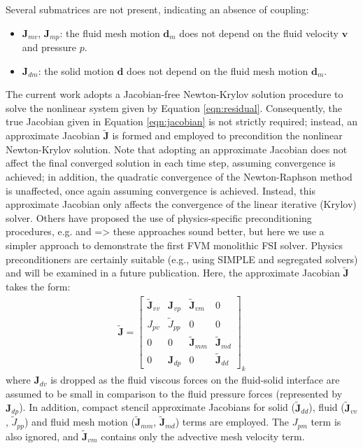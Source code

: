 \documentclass[sn-mathphys,Numbered]{sn-jnl}%
\newcommand{\bb}{\boldsymbol}
\begin{document}
Several submatrices are not present, indicating an absence of coupling:
\begin{itemize}
	\item $\bb{J}_{mv}$, $\bb{J}_{mp}$: the fluid mesh motion $\bb{d}_m$ does not depend on the fluid velocity $\bb{v}$ and pressure $p$.
	\item $\bb{J}_{dm}$: the solid motion $\bb{d}$ does not depend on the fluid mesh motion $\bb{d}_m$. 
\end{itemize}

The current work adopts a Jacobian-free Newton-Krylov solution procedure \citep{Cardiff2025JFNK} to solve the nonlinear system given by Equation \ref{eqn:residual}.
Consequently, the true Jacobian given in Equation \ref{eqn:jacobian} is not strictly required; instead, an approximate Jacobian $\tilde{\bb{J}}$ is formed and employed to precondition the nonlinear Newton-Krylov solution.
Note that adopting an approximate Jacobian does not affect the final converged solution in each time step, assuming convergence is achieved; in addition, the quadratic convergence of the Newton-Raphson method is unaffected, once again assuming convergence is achieved.
Instead, this approximate Jacobian only affects the convergence of the linear iterative (Krylov) solver.
Others have proposed the use of physics-specific preconditioning procedures, e.g. \citet{Gee20??_Wall} and \citet{Heil2008} => these approaches sound better, but here we use a simpler approach to demonstrate the first FVM monolithic FSI solver.
Physics preconditioners are certainly suitable (e.g., using SIMPLE and segregated solvers) and will be examined in a future publication.
Here, the approximate Jacobian $\tilde{\bb{J}}$ takes the form:
\begin{eqnarray} \label{eqn:approx_jacobian}
\tilde{\bb{J}} =
\begin{bmatrix}
\tilde{\bb{J}}_{vv} & \bb{J}_{vp} & \tilde{\bb{J}}_{vm} & 0 \\
J_{pv} & \tilde{J}_{pp} & 0 & 0 \\
0 & 0 & \tilde{\bb{J}}_{mm} & \tilde{\bb{J}}_{md} \\
0 & \bb{J}_{dp} & 0 & \tilde{\bb{J}}_{dd}
\end{bmatrix}_k
\end{eqnarray}
where $\bb{J}_{dv}$ is dropped as the fluid viscous forces on the fluid-solid interface are assumed to be small in comparison to the fluid pressure forces (represented by $\bb{J}_{dp}$).
In addition, compact stencil approximate Jacobians for solid ($\tilde{\bb{J}}_{dd}$), fluid ($\tilde{\bb{J}}_{vv}$, $\tilde{J}_{pp}$) and fluid mesh motion ($\tilde{\bb{J}}_{mm}$, $\tilde{\bb{J}}_{md}$) terms are employed.
The $J_{pm}$ term is also ignored, and $\tilde{\bb{J}}_{vm}$ contains only the advective mesh velocity term.
\end{document}
